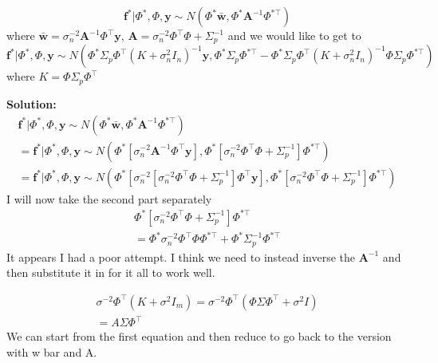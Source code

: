 \documentclass[11pt]{article}
\begin{document}
\begin{equation}
  \textbf{f}^* | \Phi^*, \Phi, \textbf{y} \sim N(\Phi^* \bar{\textbf{w}}, \Phi^* \textbf{A}^{-1} \Phi^{* \top})
\end{equation}
where $\bar{\textbf{w}} = \sigma_n^{-2} \textbf{A}^{-1} \Phi^\top \textbf{y}$, $\textbf{A} = \sigma_n^{-2} \Phi^\top \Phi + \Sigma_p^{-1}$
and we would like to get to
\begin{equation}
 \textbf{f}^* | \Phi^*, \Phi, \textbf{y} \sim N (\Phi^* \Sigma_p \Phi^\top (K + \sigma_n^2 I_n)^{-1} \textbf{y}, \Phi^* \Sigma_p \Phi^{* \top} - \Phi^* \Sigma_p \Phi^\top (K+\sigma_n^2 I_n)^{-1} \Phi \Sigma_p \Phi^{* \top})
\end{equation}
where $K=\Phi \Sigma_p \Phi^\top$

\textbf{Solution:}
\begin{gather}
  \textbf{f}^* | \Phi^*, \Phi, \textbf{y} \sim N(\Phi^* \bar{\textbf{w}}, \Phi^* \textbf{A}^{-1} \Phi^{* \top}) \\
  = \textbf{f}^* | \Phi^*, \Phi, \textbf{y} \sim N(\Phi^* [\sigma_n^{-2} \textbf{A}^{-1} \Phi^\top \textbf{y}], \Phi^* [\sigma_n^{-2} \Phi^\top \Phi + \Sigma_p^{-1}] \Phi^{* \top}) \\
  =  \textbf{f}^* | \Phi^*, \Phi, \textbf{y} \sim N(\Phi^* [\sigma_n^{-2} [\sigma_n^{-2} \Phi^\top \Phi + \Sigma_p^{-1}] \Phi^\top \textbf{y}], \Phi^* [\sigma_n^{-2} \Phi^\top \Phi + \Sigma_p^{-1}] \Phi^{* \top})
\end{gather}
I will now take the second part separately
\begin{gather}
  \Phi^* [\sigma_n^{-2} \Phi^\top \Phi + \Sigma_p^{-1}] \Phi^{* \top} \\
  = \Phi^* \sigma_n^{-2} \Phi^\top \Phi \Phi^{* \top} + \Phi^* \Sigma_p^{-1} \Phi^{* \top}
\end{gather}
It appears I had a poor attempt.
I think we need to instead inverse the $\textbf{A}^{-1}$ and then substitute it in for it all to work well.

\begin{gather}
  \sigma^{-2} \Phi^\top (K + \sigma^{2} I_m) = \sigma^{-2} \Phi^\top (\Phi \Sigma \Phi^\top + \sigma^2 I) \\
  = A \Sigma \Phi^\top
\end{gather}
We can start from the first equation and then reduce to go back to the version with w bar and A.
\end{document}
